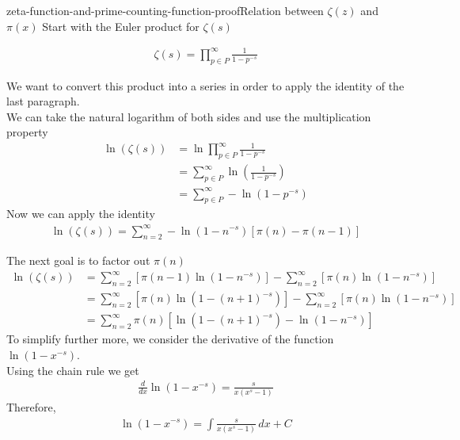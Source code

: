 \documentclass[preview]{standalone}
\begin{document}
\begin{snippettheorem}{zeta-function-and-prime-counting-function-proof}{Relation between \(\zeta(z)\) and \(\pi(x)\)}
    Start with the Euler product for \(\zeta(s)\)

    \begin{align*}
        \zeta (s)=\prod_{p\in P}^{\infty}\frac{1}{1-p^{-s}}
    \end{align*}
    
    We want to convert this product into a series in order to apply the identity of the last paragraph.
    \\
    We can take the natural logarithm of both sides and use the multiplication property
    \begin{align*}
        \ln\left(\zeta (s)\right)&=\ln\prod_{p\in P}^{\infty}\frac{1}{1-p^{-s}}
        \\
        &=\sum_{p\in P}^{\infty}\ln\left(\frac{1}{1-p^{-s}}\right)
        \\
        &=\sum_{p\in P}^{\infty}-\ln\left(1-p^{-s}\right)
    \end{align*}
    Now we can apply the identity
    \begin{align*}
        \ln\left(\zeta (s)\right)=\sum_{n=2}^{\infty}-\ln\left(1-n^{-s}\right)\left[\pi (n) - \pi (n-1)\right]
    \end{align*}
    
    The next goal is to factor out \(\pi (n)\)
    \begin{align*}
        \ln\left(\zeta(s)\right)
        &=\sum_{n=2}^{\infty}\left[\pi (n-1)\ln\left(1-n^{-s}\right)\right]
        -\sum_{n=2}^{\infty}\left[\pi (n)\ln\left(1-n^{-s}\right)\right]
        \\&=\sum_{n=2}^{\infty}\left[\pi (n)\ln\left(1-{(n+1)}^{-s}\right)\right]
        -\sum_{n=2}^{\infty}\left[\pi (n)\ln\left(1-n^{-s}\right)\right]
        \\
        &=\sum_{n=2}^{\infty}\pi (n)\left[\ln\left(1-{(n+1)}^{-s}\right)-\ln\left(1-n^{-s}\right)\right]
    \end{align*}
    To simplify further more, we consider the derivative of the function \(\ln(1-x^{-s})\).
    \\
    Using the chain rule we get
    \begin{align*}
        \frac{d}{dx}\ln\left(1-x^{-s}\right)=
        \frac{s}{x(x^s-1)}
    \end{align*}
    Therefore,
    \begin{align*}
        \ln\left(1-x^{-s}\right)=
        \int \frac{s}{x(x^s-1)}\,dx+C
    \end{align*}
    

\end{snippettheorem}
\end{document}
